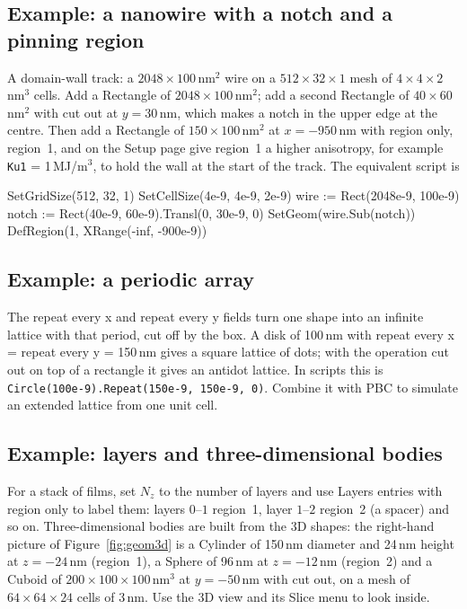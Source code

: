 \documentclass[11pt,a4paper,oneside]{book}
\newcommand{\code}[1]{\texttt{#1}}
\renewcommand{\_}{\textunderscore\allowbreak}
\newcommand{\menu}[1]{\textsf{#1}}
\begin{document}
\subsection{Example: a nanowire with a notch and a pinning region}

A domain-wall track: a $2048\times100$\,nm$^2$ wire on a $512\times32\times1$ mesh of $4\times4\times2$\,nm$^3$
cells. Add a \menu{Rectangle} of $2048\times100$\,nm$^2$; add a second \menu{Rectangle} of $40\times60$\,nm$^2$
with \menu{cut out} at $y = 30$\,nm, which makes a notch in the upper edge at the centre. Then add a
\menu{Rectangle} of $150\times100$\,nm$^2$ at $x = -950$\,nm with \menu{region only}, region~1, and on the Setup
page give region~1 a higher anisotropy, for example \code{Ku1} = 1\,MJ/m$^3$, to hold the wall at the start of the
track. The equivalent script is
\begin{mxcode}
SetGridSize(512, 32, 1)
SetCellSize(4e-9, 4e-9, 2e-9)
wire := Rect(2048e-9, 100e-9)
notch := Rect(40e-9, 60e-9).Transl(0, 30e-9, 0)
SetGeom(wire.Sub(notch))
DefRegion(1, XRange(-inf, -900e-9))
\end{mxcode}

\subsection{Example: a periodic array}

The \menu{repeat every x} and \menu{repeat every y} fields turn one shape into an infinite lattice with that
period, cut off by the box. A disk of 100\,nm with \menu{repeat every x} = \menu{repeat every y} = 150\,nm gives a
square lattice of dots; with the operation \menu{cut out} on top of a rectangle it gives an antidot lattice. In
scripts this is \code{Circle(100e-9).Repeat(150e-9, 150e-9, 0)}. Combine it with \menu{PBC} to simulate an
extended lattice from one unit cell.

\subsection{Example: layers and three-dimensional bodies}

For a stack of films, set $N_z$ to the number of layers and use \menu{Layers} entries with \menu{region only} to
label them: layers $0$--$1$ region~1, layer $1$--$2$ region~2 (a spacer) and so on. Three-dimensional bodies are
built from the 3D shapes: the right-hand picture of Figure~\ref{fig:geom3d} is a \menu{Cylinder} of 150\,nm
diameter and 24\,nm height at $z = -24$\,nm (region~1), a \menu{Sphere} of 96\,nm at $z = -12$\,nm (region~2) and a
\menu{Cuboid} of $200\times100\times100$\,nm$^3$ at $y = -50$\,nm with \menu{cut out}, on a mesh of
$64\times64\times24$ cells of 3\,nm. Use the \menu{3D} view and its \menu{Slice} menu to look inside.
\end{document}
